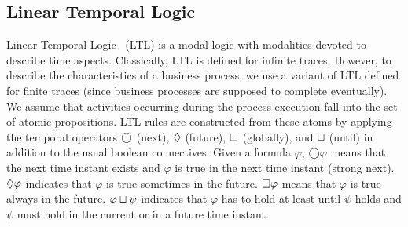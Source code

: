 

		
		




\subsection{Linear Temporal Logic}

Linear Temporal Logic~\cite{Pnueli77} (LTL) is a modal logic with modalities devoted to describe time aspects. Classically, LTL is defined for infinite traces. However, to describe the characteristics of a business process, we use a variant of LTL defined for finite traces (since business processes are supposed to complete eventually).
%
We assume that activities occurring during the process execution fall into the set of atomic propositions. LTL rules are constructed from these atoms by applying the temporal operators $\bigcirc$ (next), $\lozenge$ (future), $\square$ (globally), and $\sqcup$ (until) in addition to the usual boolean connectives. Given a formula $\varphi$, $\bigcirc \varphi$ means that the next time instant exists and $\varphi$ is true in the next time instant (strong next). $\lozenge \varphi$ indicates that $\varphi$ is true sometimes in the future. $\square \varphi$ means that $\varphi$ is true always in the future. $\varphi \sqcup \psi$ indicates that $\varphi$ has to hold at least until $\psi$  holds and $\psi$ must hold in the current or in a future time instant.

